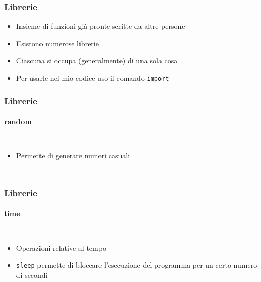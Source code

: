 \begin{contentframe}
    \frametitle{Librerie}

    \begin{itemize}
        \item Insieme di funzioni già pronte scritte da altre persone
        \bigskip
        \item Esistono numerose librerie
        \item Ciascuna si occupa (generalmente) di una sola cosa
        \bigskip
        \item Per usarle nel mio codice uso il comando \texttt{import}
    \end{itemize}
\end{contentframe}

\begin{contentframe}
    \frametitle{Librerie}
    \framesubtitle{random}

    \begin{columns}
        \begin{itemize}
            \item Permette di generare numeri casuali
        \end{itemize}
        
        \centering
    \end{columns}
\end{contentframe}

\begin{contentframe}
    \frametitle{Librerie}
    \framesubtitle{time}

    \begin{columns}
        \begin{itemize}
            \item Operazioni relative al tempo
            \bigskip
            \item \texttt{sleep} permette di bloccare l'esecuzione del programma per un certo numero di secondi
        \end{itemize}
        
        \centering
    \end{columns}
\end{contentframe}

